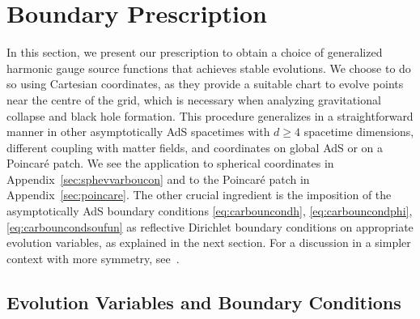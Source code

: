 \documentclass[a4paper,11pt]{article}
\numberwithin{equation}{section}
\begin{document}
\section{Boundary Prescription}\label{sec:pre_sta}

In this section, we present our prescription to obtain a choice of generalized harmonic gauge source functions that achieves stable evolutions.
We choose to do so using Cartesian coordinates, as they provide a suitable chart to evolve points near the centre of the grid, which is necessary when analyzing gravitational collapse and black hole formation. This procedure generalizes in a straightforward manner in other asymptotically AdS spacetimes with $d\geq 4$ spacetime dimensions, different coupling with matter fields, and coordinates on global AdS or on a Poincar\'{e} patch. We see the application to spherical coordinates in Appendix~\ref{sec:sphevvarboucon} and to the Poincar\'e patch in Appendix~\ref{sec:poincare}.
The other crucial ingredient is the imposition of the asymptotically AdS boundary conditions \eqref{eq:carbouncondh}, \eqref{eq:carbouncondphi}, \eqref{eq:carbouncondsoufun} as reflective Dirichlet boundary conditions on appropriate evolution variables, as explained in the next section.
For a discussion in a simpler context with more symmetry, see~\cite{Bantilan:2012vu}.

\subsection{Evolution Variables and Boundary Conditions}\label{subsec:cartevvarboucon}
\end{document}
